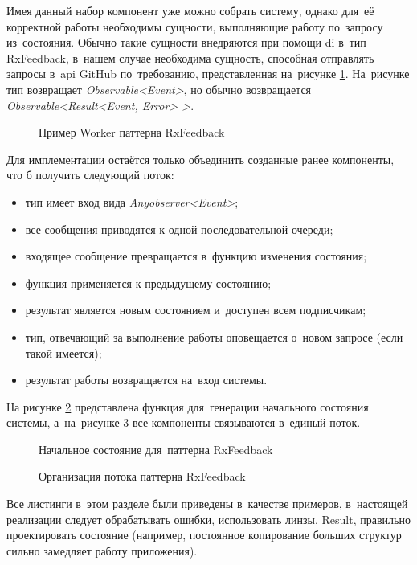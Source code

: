 Имея данный набор компонент уже можно собрать систему, однако для~её корректной работы необходимы сущности, выполняющие работу по~запросу из~состояния. Обычно такие сущности внедряются при помощи \gls{di} в~тип RxFeedback, в~нашем случае необходима сущность, способная отправлять запросы в~\gls{api} GitHub по~требованию, представленная на~рисунке \ref{sec:development:arch:ios:rxfeedback:example:worker}. На~рисунке тип возвращает \textit{Observable<Event>}, но обычно возвращается \textit{Observable<Result<Event, Error> >}.

\begin{figure}[h]
  
   \caption{Пример Worker паттерна RxFeedback}
   \label{sec:development:arch:ios:rxfeedback:example:worker}
\end{figure}

Для имплементации остаётся только объединить созданные ранее компоненты, что б получить следующий поток:

\begin{itemize}
  \item тип имеет вход вида \textit{Any\gls{observer}<Event>};
  \item все сообщения приводятся к одной последовательной очереди;
  \item входящее сообщение превращается в~функцию изменения состояния;
  \item функция применяется к предыдущему состоянию;
  \item результат является новым состоянием и~доступен всем подписчикам;
  \item тип, отвечающий за выполнение работы оповещается о~новом запросе (если такой имеется);
  \item результат работы возвращается на~вход системы.
\end{itemize}

На рисунке \ref{sec:development:arch:ios:rxfeedback:example:initial-state} представлена функция для~генерации начального состояния системы, а~на~рисунке \ref{sec:development:arch:ios:rxfeedback:example:composition} все компоненты связываются в~единый поток.

\begin{figure}[h]
  
   \caption{Начальное состояние для~паттерна RxFeedback}
   \label{sec:development:arch:ios:rxfeedback:example:initial-state}
\end{figure}

\begin{figure}[h]
  
   \caption{Организация потока паттерна RxFeedback}
   \label{sec:development:arch:ios:rxfeedback:example:composition}
\end{figure}

Все листинги в~этом разделе были приведены в~качестве примеров, в~настоящей реализации следует обрабатывать ошибки, использовать линзы, Result, правильно проектировать состояние (например, постоянное копирование больших структур сильно замедляет работу приложения).